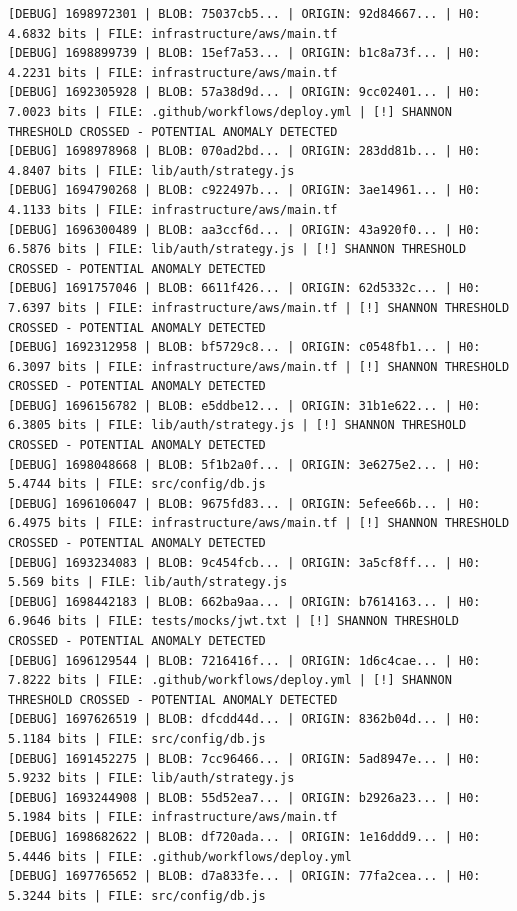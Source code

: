\documentclass[12pt, a4paper, oneside]{report}
\begin{document}
\begin{lstlisting}[basicstyle=\tiny\ttfamily]
[DEBUG] 1698972301 | BLOB: 75037cb5... | ORIGIN: 92d84667... | H0: 4.6832 bits | FILE: infrastructure/aws/main.tf
[DEBUG] 1698899739 | BLOB: 15ef7a53... | ORIGIN: b1c8a73f... | H0: 4.2231 bits | FILE: infrastructure/aws/main.tf
[DEBUG] 1692305928 | BLOB: 57a38d9d... | ORIGIN: 9cc02401... | H0: 7.0023 bits | FILE: .github/workflows/deploy.yml | [!] SHANNON THRESHOLD CROSSED - POTENTIAL ANOMALY DETECTED
[DEBUG] 1698978968 | BLOB: 070ad2bd... | ORIGIN: 283dd81b... | H0: 4.8407 bits | FILE: lib/auth/strategy.js
[DEBUG] 1694790268 | BLOB: c922497b... | ORIGIN: 3ae14961... | H0: 4.1133 bits | FILE: infrastructure/aws/main.tf
[DEBUG] 1696300489 | BLOB: aa3ccf6d... | ORIGIN: 43a920f0... | H0: 6.5876 bits | FILE: lib/auth/strategy.js | [!] SHANNON THRESHOLD CROSSED - POTENTIAL ANOMALY DETECTED
[DEBUG] 1691757046 | BLOB: 6611f426... | ORIGIN: 62d5332c... | H0: 7.6397 bits | FILE: infrastructure/aws/main.tf | [!] SHANNON THRESHOLD CROSSED - POTENTIAL ANOMALY DETECTED
[DEBUG] 1692312958 | BLOB: bf5729c8... | ORIGIN: c0548fb1... | H0: 6.3097 bits | FILE: infrastructure/aws/main.tf | [!] SHANNON THRESHOLD CROSSED - POTENTIAL ANOMALY DETECTED
[DEBUG] 1696156782 | BLOB: e5ddbe12... | ORIGIN: 31b1e622... | H0: 6.3805 bits | FILE: lib/auth/strategy.js | [!] SHANNON THRESHOLD CROSSED - POTENTIAL ANOMALY DETECTED
[DEBUG] 1698048668 | BLOB: 5f1b2a0f... | ORIGIN: 3e6275e2... | H0: 5.4744 bits | FILE: src/config/db.js
[DEBUG] 1696106047 | BLOB: 9675fd83... | ORIGIN: 5efee66b... | H0: 6.4975 bits | FILE: infrastructure/aws/main.tf | [!] SHANNON THRESHOLD CROSSED - POTENTIAL ANOMALY DETECTED
[DEBUG] 1693234083 | BLOB: 9c454fcb... | ORIGIN: 3a5cf8ff... | H0: 5.569 bits | FILE: lib/auth/strategy.js
[DEBUG] 1698442183 | BLOB: 662ba9aa... | ORIGIN: b7614163... | H0: 6.9646 bits | FILE: tests/mocks/jwt.txt | [!] SHANNON THRESHOLD CROSSED - POTENTIAL ANOMALY DETECTED
[DEBUG] 1696129544 | BLOB: 7216416f... | ORIGIN: 1d6c4cae... | H0: 7.8222 bits | FILE: .github/workflows/deploy.yml | [!] SHANNON THRESHOLD CROSSED - POTENTIAL ANOMALY DETECTED
[DEBUG] 1697626519 | BLOB: dfcdd44d... | ORIGIN: 8362b04d... | H0: 5.1184 bits | FILE: src/config/db.js
[DEBUG] 1691452275 | BLOB: 7cc96466... | ORIGIN: 5ad8947e... | H0: 5.9232 bits | FILE: lib/auth/strategy.js
[DEBUG] 1693244908 | BLOB: 55d52ea7... | ORIGIN: b2926a23... | H0: 5.1984 bits | FILE: infrastructure/aws/main.tf
[DEBUG] 1698682622 | BLOB: df720ada... | ORIGIN: 1e16ddd9... | H0: 5.4446 bits | FILE: .github/workflows/deploy.yml
[DEBUG] 1697765652 | BLOB: d7a833fe... | ORIGIN: 77fa2cea... | H0: 5.3244 bits | FILE: src/config/db.js

\end{lstlisting}
\end{document}
